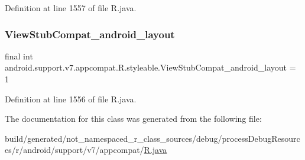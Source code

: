 Definition at line 1557 of file R.\+java.

\mbox{\label{classandroid_1_1support_1_1v7_1_1appcompat_1_1_r_1_1styleable_a1850da4fab00e8c58cb80eccbffa9339}} 
\subsubsection{\texorpdfstring{ViewStubCompat\_android\_layout}{ViewStubCompat\_android\_layout}}
{\footnotesize\ttfamily final int android.\+support.\+v7.\+appcompat.\+R.\+styleable.\+View\+Stub\+Compat\+\_\+android\+\_\+layout = 1\hspace{0.3cm}{\ttfamily [static]}}



Definition at line 1556 of file R.\+java.



The documentation for this class was generated from the following file\+:\begin{DoxyCompactItemize}
\item 
build/generated/not\+\_\+namespaced\+\_\+r\+\_\+class\+\_\+sources/debug/process\+Debug\+Resources/r/android/support/v7/appcompat/\mbox{\hyperlink{android_2support_2v7_2appcompat_2_r_8java}{R.\+java}}\end{DoxyCompactItemize}
